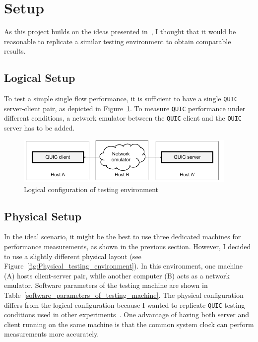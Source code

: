 \documentclass[12pt,a4paper,twoside,openright]{report}
\begin{document}
\section{Setup}

As this project builds on the ideas presented in~\cite{Making_QUIC_Quicker}, I thought that it would be reasonable to replicate a similar testing environment to obtain comparable results.

\subsection{Logical Setup}
To test a simple single flow performance, it is sufficient to have a single \texttt{QUIC} server-client pair, as depicted in Figure~\ref{fig:Logical_testing_environment}.
To measure \texttt{QUIC} performance under different conditions, a network emulator between the \texttt{QUIC} client and the \texttt{QUIC} server has to be added.

    \begin{figure}[ht]
    \centering
    \includegraphics[width=0.95\textwidth]{figs/Logical_testing_environment.png}
    \caption{Logical configuration of testing environment}
    \label{fig:Logical_testing_environment}
    \end{figure}

\subsection{Physical Setup} \label{physical_setup_subsection}


    In the ideal scenario, it might be the best to use three dedicated machines for performance measurements, as shown in the previous section.
    However, I decided to use a slightly different physical layout (see Figure~\ref{fig:Physical_testing_environment}).
    In this environment, one machine (A) hosts client-server pair, while another computer (B) acts as a network emulator.
    Software parameters of the testing machine are shown in Table~\ref{software_parameters_of_testing_machine}.
    The physical configuration differs from the logical configuration because I wanted to replicate \texttt{QUIC} testing conditions used in other experiments~\cite{Making_QUIC_Quicker}.
    One advantage of having both server and client running on the same machine is that the common system clock can perform measurements more accurately. 
    
\end{document}
